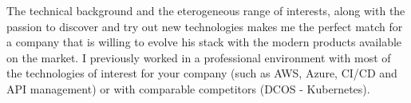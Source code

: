 \documentclass[11pt, a4paper]{awesome-cv}
\begin{document}
\begin{cvletter}
The technical background and the eterogeneous range of interests, along with the passion to discover and try out new technologies makes me the perfect match for a company that is willing to evolve his stack with the modern products available on the market. I previously worked in a professional environment with most of the technologies of interest for your company (such as AWS, Azure, CI/CD and API management) or with comparable competitors (DCOS - Kubernetes).

\end{cvletter}


\makeletterclosing
\end{document}
